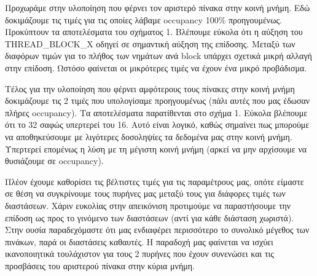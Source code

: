 \documentclass[titlepage]{article}
\begin{document}
Προχωράμε στην υλοποίηση που φέρνει τον αριστερό πίνακα στην κοινή μνήμη. Εδώ δοκιμάζουμε τις τιμές για τις οποίες λάβαμε occupancy 100\% προηγουμένως. Προκύπτουν τα αποτελέσματα του σχήματος 1. Βλέπουμε εύκολα ότι η αύξηση του THREAD\_BLOCK\_X οδηγεί σε σημαντική αύξηση της επίδοσης. Μεταξύ των διαφόρων τιμών για το πλήθος των νημάτων ανά block υπάρχει σχετικά μικρή αλλαγή στην επίδοση. Ωστόσο φαίνεται οι μικρότερες τιμές να έχουν ένα μικρό προβάδισμα.

Τέλος για την υλοποίηση που φέρνει αμφότερους τους πίνακες στην κοινή μνήμη δοκιμάζουμε τις 2 τιμές που υπολογίσαμε προηγουμένως (πάλι αυτές που μας έδωσαν πλήρες occupancy). Τα αποτελέσματα παρατίθενται στο σχήμα 1. Εύκολα βλέπουμε ότι το 32 σαφώς υπερτερεί του 16. Αυτό είναι λογικό, καθώς σημαίνει πως μπορούμε να αποθηκεύσουμε με λιγότερες δοσοληψίες τα δεδομένα μας στην κοινή μνήμη. Υπερτερεί επομένως η λύση με τη μέγιστη κοινή μνήμη (αρκεί να μην αρχίσουμε να θυσιάζουμε σε occupancy).

Πλέον έχουμε καθορίσει τις βέλτιστες τιμές για τις παραμέτρους μας, οπότε είμαστε σε θέση να συγκρίνουμε τους πυρήνες μας μεταξύ τους για διάφορες τιμές των διαστάσεων. Χάριν ευκολίας στην απεικόνιση προτιμούμε να παραστήσουμε την επίδοση ως προς το γινόμενο των διαστάσεων (αντί για κάθε διάσταση χωριστά). Στην ουσία παραδεχόμαστε ότι μας ενδιαφέρει περισσότερο το συνολικό μέγεθος των πινάκων, παρά οι διαστάσεις καθαυτές. Η παραδοχή μας φαίνεται να ισχύει ικανοποιητικά τουλάχιστον για τους 2 πυρήνες που έχουν συνενώσει και τις προσβάσεις του αριστερού πίνακα στην κύρια μνήμη.
\end{document}
